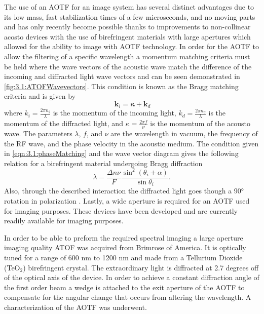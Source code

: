 \documentclass[12pt]{article}
\begin{document}
The use of an AOTF for an image system has several distinct advantages due to its low mass, fast stabilization times of a few microseconds, and no moving parts and has only recently become possible thanks to improvements to non-collinear acosto devices with the use of birefringent materials with large apertures \citep{Chang1974, Voloshinov2007} which allowed for the ability to image with AOTF technology. In order for the AOTF to allow the filtering of a specific wavelength a momentum matching criteria must be held where the wave vectors of the acoustic wave match the difference of the incoming and diffracted light wave vectors and can be seen demonstrated in \autoref{fig:3.1:ATOFWavevectors}. This condition is known as the Bragg matching criteria and is given by 
\begin{equation}
    \ \mathbf{k}_{i} = \boldsymbol\kappa + \mathbf{k}_{d}
    \label{eqn:3.1:phaseMatching}
\end{equation}
where ${k}_{i} = \frac{2\pi n_{i}}{\lambda}$ is the momentum of the incoming light, ${k}_{d} = \frac{2\pi n_{d}}{\lambda}$ is the momentum of the diffracted light, and $\kappa = \frac{2\pi f}{\nu}$ is the momentum of the acousto wave. The parameters $\lambda$, $f$, and $\nu$ are the wavelength in vacuum, the frequency of the RF wave, and the phase velocity in the acoustic medium. The condition given in \autoref{eqn:3.1:phaseMatching} and the wave vector diagram gives the following relation for a birefringent material undergoing Bragg diffraction
\begin{equation}
    \lambda  = \frac{\Delta n\nu}{F}\frac{\sin^{2}(\theta_{i}+\alpha)}{\sin\theta_{i}}.
    \label{eqn:3.1:AOTFWavelengthDependance}
\end{equation}
Also, through the described interaction the diffracted light goes though a 90\si{\degree} rotation in polarization \citep{Voloshinov1996}. Lastly, a wide aperture is required for an AOTF used for imaging purposes. These devices have been developed \citep{Gass1991} and are currently readily available for imaging purposes.

In order to be able to preform the required spectral imaging a large aperture imaging quality ATOF was acquired from Brimrose of America. It is optically tuned for a range of 600 nm to 1200 nm and made from a Tellurium Dioxide (TeO$_{2}$) birefringent crystal. The extraordinary light is diffracted at 2.7 degrees off of the optical axis of the device. In order to achieve a constant diffraction angle of the first order beam a wedge is attached to the exit aperture of the AOTF to compensate for the angular change that occurs from altering the wavelength. A characterization of the AOTF was underwent.
\end{document}
